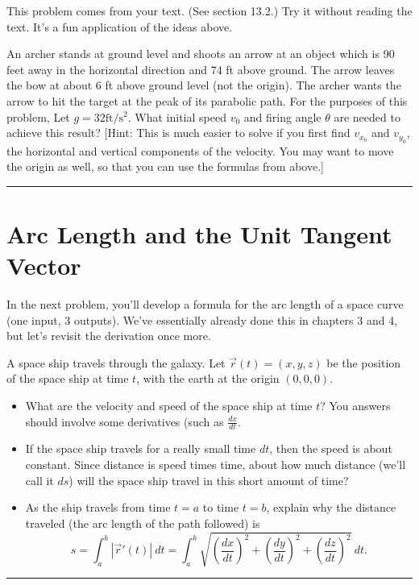 This problem comes from your text. (See section 13.2.)  Try it without reading the text.  It's a fun application of the ideas above.
\begin{problem}%
 An archer stands at ground level and shoots an arrow at an object which is 90 feet away in the horizontal direction and 74 ft above ground. The arrow leaves the bow at about 6 ft above ground level (not the origin). 
 The archer wants the arrow to hit the target at the peak of its parabolic path. 
 For the purposes of this problem, Let $g = 32 \text{ft}/\text{s}^2$. 
 What initial speed $v_0$ and firing angle $\theta$ are needed to achieve this result? 
 [Hint: This is much easier to solve if you first find $v_{x_0}$ and $v_{y_0}$, the horizontal and vertical components of the velocity. You may want to move the origin as well, so that you can use the formulas from above.]
\hrule\end{problem}

\section{Arc Length and the Unit Tangent Vector}

 In the next problem, you'll develop a formula for the arc length of a space curve (one input, 3 outputs).  We've essentially already done this in chapters 3 and 4, but let's revisit the derivation once more.
\begin{problem}
A space ship travels through the galaxy. Let $\vec r(t) = (x,y,z)$ 
%
be the position of the space ship at time $t$, with the earth at the origin $(0,0,0)$. 
\begin{itemize}
 \item What are the velocity and speed of the space ship at time $t$? You answers should involve some derivatives (such as $\frac{dx}{dt}$.
 \item If the space ship travels for a really small time $dt$, then the speed is about constant. Since distance is speed times time, about how much distance (we'll call it $ds$) will the space ship travel in this short amount of time?
 \item As the ship travels from time $t=a$ to time $t=b$, explain why the distance traveled (the arc length of the path followed) is $$s=\int_a^b |\vec r '(t)|\ dt = \int_a^b \sqrt{\left(\frac{dx}{dt}\right)^2+\left(\frac{dy}{dt}\right)^2+\left(\frac{dz}{dt}\right)^2}\ dt .$$
\end{itemize}

\hrule\end{problem}

